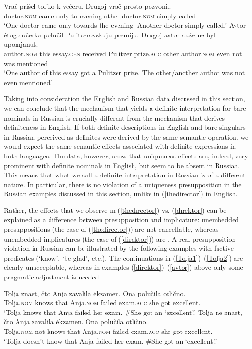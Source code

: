 \documentclass[output=paper,colorlinks,citecolor=brown]{langscibook}
\begin{document}
\ea \label{vrac} \gll
Vra\v{c}			pri\v{s}el	tol'ko		k	ve\v{c}eru.	Drugoj	vra\v{c}				prosto	pozvonil.   \\
doctor.\textsc{nom}	came only 		to	evening 	other   	doctor.\textsc{nom}		simply 	called\\
\glt `One doctor came only towards the evening. Another doctor simply called.'
\z
\ea \label{avtor} \gll
Avtor	\.{e}togo		o\v{c}erka		polu\v{c}il	Pulitcerovskuju	premiju. Drugoj	avtor				da\v{z}e	ne		byl	upomjanut.\\
 author.\textsc{nom} this		essay.\textsc{gen} 	received Pulitzer prize.\textsc{acc} other		author.\textsc{nom}	 	even	not	was	mentioned\\
\glt `One author of this essay got a Pulitzer prize. The other/another author was not even mentioned.'
\z
 
\noindent Taking into consideration the English and Russian data discussed in this section, we can conclude that the mechanism that yields a definite interpretation for bare nominals in Russian is crucially different from the mechanism that derives definiteness in English. If both definite descriptions in English and bare singulars in Russian perceived as definites were derived by the same semantic operation, we would expect the same semantic effects associated with definite expressions in both languages. The data, however, show that uniqueness effects are, indeed, very prominent with definite nominals in English, but seem to be absent in Russian. This means
that what we call a definite interpretation in Russian is of a different nature. In particular, there is no violation of a uniqueness presupposition in the Russian examples discussed in this section, unlike in (\ref{thedirector}) in English.

Rather, the effects that we observe in (\ref{thedirector}) vs. (\ref{direktor}) can be explained as a difference between presupposition and implicature: unembedded presuppositions (the case of (\ref{thedirector})) are not cancellable, whereas unembedded implicatures (the case of (\ref{direktor})) are \citep[see, for instance,][]{beavergeurts14}.  A real presupposition violation in Russian can be illustrated by the following examples with factive predicates (`know', `be glad', etc.). The continuations in (\ref{Tolja1})--(\ref{Tolja2}) are clearly unacceptable, whereas in examples (\ref{direktor})--(\ref{avtor}) above only some pragmatic adjustment is needed. 

\ea  \label{Tolja1} \gll
Tolja		znaet,	\v{c}to		Anja		zavalila	\.{e}kzamen.	\minsp{\#} Ona	polu\v{c}ila 	otli\v{c}no. \\
Tolja.\textsc{nom} knows that 	Anja.\textsc{nom}	failed 		exam.\textsc{acc} {} she 	got 		excellent.\\
\glt `Tolja knows that Anja failed her exam. $\#$She got an `excellent'.'
\z
\ea  \label{Tolja2} \gll
Tolja		ne		znaet, \v{c}to 		Anja 		zavalila	\.{e}kzamen. \minsp{\#} Ona	polu\v{c}ila	otli\v{c}no. \\
Tolja.\textsc{nom}  not	knows that 	Anja.\textsc{nom}	failed 		exam.\textsc{acc} {} she	got 		excellent.\\
\glt `Tolja doesn't know that Anja failed her exam. $\#$She got an `excellent'.'
\z
\end{document}
